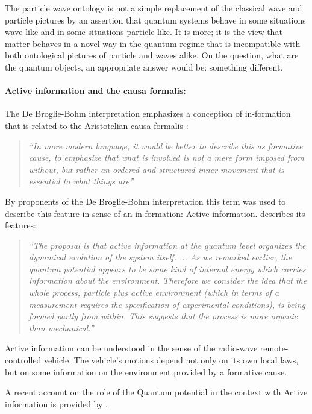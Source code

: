 \documentclass{article}
\begin{document}
The particle wave ontology is not a simple replacement of the classical wave and particle pictures by an assertion that quantum systems behave in some situations wave-like and in some situations particle-like. It is more; it is the view that matter behaves in a novel way in the quantum regime that is incompatible with both ontological pictures of particle and waves alike. On the question, what are the quantum objects, an appropriate answer would be: something different.


\paragraph{Active information and the causa formalis:}

The De Broglie-Bohm interpretation emphasizes a conception of in-formation that is related to the Aristotelian causa formalis \cite[p.16]{bohm1981wholeness}: 

\begin{quote}
\textit{``In more modern language, it would be better to describe this as formative cause, to emphasize that what is involved is not a mere form imposed from without, but rather an ordered and structured inner movement that is essential to what things are''}
\end{quote}

By proponents of the De Broglie-Bohm interpretation this term was used to describe this feature in sense of an in-formation: Active information. \cite[p.19]{hiley2005can} describes its features: 

\begin{quote}
\textit{``The proposal is that active information at the quantum level organizes
the dynamical evolution of the system itself.
...
As we remarked earlier, the quantum potential appears to be some kind of internal energy which carries information about the environment. Therefore we consider the idea that the whole process, particle plus active environment (which in terms of a measurement requires the specification of experimental conditions), is being
formed partly from within. This suggests that the process is more organic than mechanical.''}
\end{quote}

Active information can be understood in the sense of the radio-wave remote-controlled vehicle. The vehicle's motions depend not only on its own local laws, but on some information on the environment provided by a formative cause. 

A recent account on the role of the Quantum potential in the context with Active information is provided by \cite[]{dennis2015bohm}.
\end{document}
